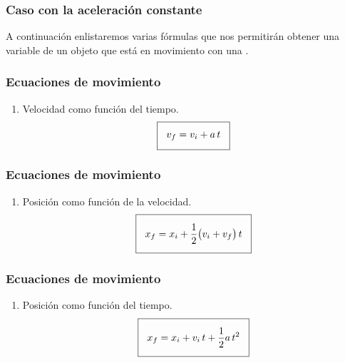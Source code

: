 \documentclass[14pt]{beamer}
\begin{document}
\begin{frame}
\frametitle{Caso con la aceleración constante}
A continuación enlistaremos varias fórmulas que nos permitirán obtener una variable de un objeto que está en movimiento con una .
\end{frame}
\begin{frame}
\frametitle{Ecuaciones de movimiento}
\begin{enumerate}[<+->]
\item Velocidad como función del tiempo.
\begin{align*}
\setlength{\fboxsep}{3\fboxsep}\boxed{
v_{f} = v_{i} + a \, t
}
\end{align*}
\seti
\end{enumerate}
\end{frame}
\begin{frame}
\frametitle{Ecuaciones de movimiento}
\begin{enumerate}[<+->]
\conti
\item Posición como función de la velocidad.
\begin{align*}
\setlength{\fboxsep}{3\fboxsep}\boxed{
x_{f} = x_{i} + \dfrac{1}{2} \big( v_{i} + v_{f} \big) \, t
}
\end{align*}
\seti
\end{enumerate}
\end{frame}
\begin{frame}
\frametitle{Ecuaciones de movimiento}
\begin{enumerate}[<+->]
\conti
\item Posición como función del tiempo.
\begin{align*}
\setlength{\fboxsep}{3\fboxsep}\boxed{
x_{f} = x_{i} + v_{i} \, t + \dfrac{1}{2} a \, t^{2}
}
\end{align*}
\seti
\end{enumerate}
\end{frame}
\end{document}
